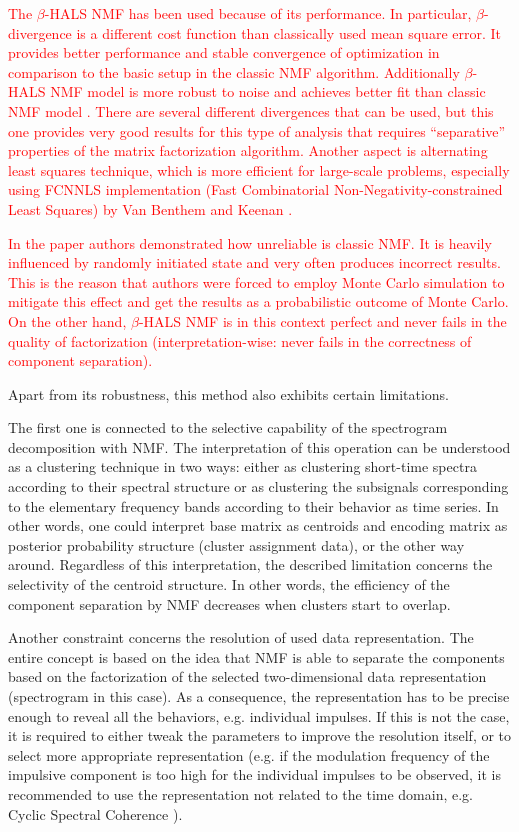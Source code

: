 \documentclass[3p,12pt]{elsarticle}
\begin{document}
\textcolor{red}{The $\beta$-HALS NMF has been used because of its performance. In particular, $\beta$-divergence is a different cost function than classically used mean square error. It provides better performance and stable convergence of optimization in comparison to the basic setup in the classic NMF algorithm. Additionally $\beta$-HALS NMF model is more robust to noise and achieves better fit than classic NMF model \cite{cichocki2008flexible}. There are several different divergences that can be used, but this one provides very good results for this type of analysis that requires “separative” properties of the matrix factorization algorithm. Another aspect is alternating least squares technique, which is more efficient for large-scale problems, especially using FCNNLS implementation (Fast Combinatorial Non-Negativity-constrained Least Squares) by Van Benthem and Keenan \cite{van2004fast}.}

\textcolor{red}{In the paper \cite{wodecki2019impulsive} authors demonstrated how unreliable is classic NMF. It is heavily influenced by randomly initiated state and very often produces incorrect results. This is the reason that authors were forced to employ Monte Carlo simulation to mitigate this effect and get the results as a probabilistic outcome of Monte Carlo. On the other hand, $\beta$-HALS NMF is in this context perfect and never fails in the quality of factorization (interpretation-wise: never fails in the correctness of component separation).}

Apart from its robustness, this method also exhibits certain limitations.  

The first one is connected to the selective capability of the spectrogram decomposition with NMF. The interpretation of this operation can be understood as a clustering technique in two ways: either as clustering short-time spectra according to their spectral structure or as clustering the subsignals corresponding to the elementary frequency bands according to their behavior as time series. In other words, one could interpret base matrix as centroids and encoding matrix as posterior probability structure (cluster assignment data), or the other way around. Regardless of this interpretation, the described limitation concerns the selectivity of the centroid structure. In other words, the efficiency of the component separation by NMF decreases when clusters start to overlap. 

Another constraint concerns the resolution of used data representation. The entire concept is based on the idea that NMF is able to separate the components based on the factorization of the selected two-dimensional data representation (spectrogram in this case). As a consequence, the representation has to be precise enough to reveal all the behaviors, e.g. individual impulses. If this is not the case, it is required to either tweak the parameters to improve the resolution itself, or to select more appropriate representation (e.g. if the modulation frequency of the impulsive component is too high for the individual impulses to be observed, it is recommended to use the representation not related to the time domain, e.g. Cyclic Spectral Coherence \cite{wodecki2019impulsive}).
\end{document}

